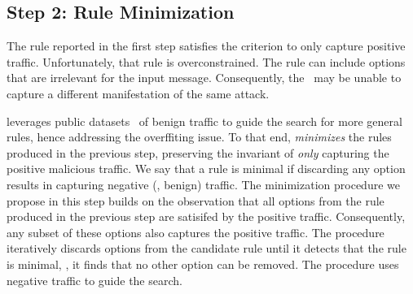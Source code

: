 \documentclass[sigconf,review, anonymous]{acmart}
\begin{document}


\subsection{Step 2: Rule Minimization}
\label{sec:minimization}

The rule reported in the first step satisfies the criterion to only
capture positive traffic. Unfortunately, that rule is overconstrained.
The rule can include options that are irrelevant for the input
message. Consequently, the \nids\ may be unable to capture a different
manifestation of the same attack.


\tname{} leverages public datasets~\cite{tcpreplay} of benign traffic
to guide the search for more general rules, hence addressing the
overffiting issue. To that end, \tname{} \emph{minimizes} the rules
produced in the previous step, preserving the invariant of \emph{only}
capturing the positive malicious traffic. We say that a rule is
minimal if discarding any option results in capturing negative (\ie{},
benign) traffic.  The minimization procedure we propose in this step
builds on the observation that all options from the rule produced in
the previous step are satisifed by the positive traffic. Consequently,
any subset of these options also captures the positive traffic. The
procedure iteratively discards options from the candidate rule until
it detects that the rule is minimal, \ie{}, it finds that no other
option can be removed. The procedure uses negative traffic to guide
the search.
\end{document}
